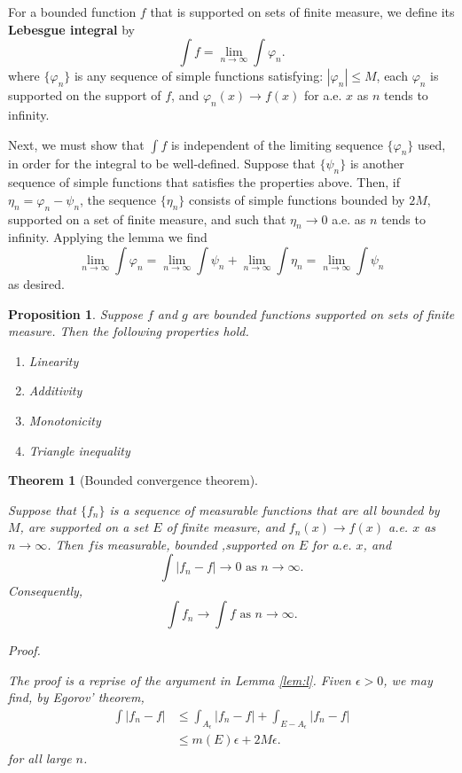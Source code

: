 \documentclass[
]{book}
\providecommand{\tightlist}{%
  \setlength{\itemsep}{0pt}\setlength{\parskip}{0pt}}
\newtheorem{theorem}{Theorem}[chapter]
\newtheorem{proposition}{Proposition}[chapter]
\theoremstyle{definition}
\theoremstyle{definition}
\theoremstyle{definition}
\theoremstyle{definition}
\theoremstyle{remark}
\begin{document}
For a bounded function \(f\) that is supported on sets of finite measure, we define its \textbf{Lebesgue integral} by
\[
\int f=\lim_{n\to\infty}\int\varphi_n.
\]
where \(\{\varphi_n\}\) is any sequence of simple functions satisfying: \(|\varphi_n|\le M\), each \(\varphi_n\) is supported on the support of \(f\), and \(\varphi_n(x)\to f(x)\) for a.e. \(x\) as \(n\) tends to infinity.

Next, we must show that \(\int f\) is independent of the limiting sequence \(\{\varphi_n\}\) used, in order for the integral to be well-defined. Suppose that \(\{\psi_n\}\) is another sequence of simple functions that satisfies the properties above. Then, if \(\eta_n = \varphi_n- \psi_n\), the sequence \(\{\eta_n\}\) consists of simple functions bounded by \(2M\), supported on a set of finite measure, and such that \(\eta_n\to 0\) a.e. as \(n\) tends to infinity. Applying the lemma we find
\[
\lim_{n\to\infty}\int \varphi_n =\lim_{n\to\infty}\int \psi_n+\lim_{n\to\infty}\int \eta_n=\lim_{n\to\infty}\int \psi_n
\]
as desired.

\begin{proposition}

Suppose \(f\) and \(g\) are bounded functions supported on sets of finite measure. Then the following properties hold.

\begin{enumerate}
\def\labelenumi{\arabic{enumi}.}
\tightlist
\item
  Linearity
\item
  Additivity
\item
  Monotonicity
\item
  Triangle inequality
\end{enumerate}

\end{proposition}

\begin{theorem}[Bounded convergence theorem]
\protect\hypertarget{thm:b}{}\label{thm:b}\leavevmode

Suppose that \(\{f_n\}\) is a sequence of measurable functions that are all bounded by \(M\), are supported on a set \(E\) of finite measure, and \(f_n(x)\to f(x)\) a.e. \(x\) as \(n\to\infty\). Then \(f\)is measurable, bounded ,supported on \(E\) for a.e. \(x\), and
\[
\int|f_n-f|\to 0 \text{ as } n\to\infty.
\]
Consequently,
\[
\int f_n\to \int f  \text{ as } n\to\infty.
\]

\emph{Proof.}

The proof is a reprise of the argument in Lemma \ref{lem:l}. Fiven \(\epsilon>0\), we may find, by Egorov' theorem,
\[
\begin{aligned}
\int|f_n-f| &\le \int_{A_\epsilon}|f_n-f|+\int_{E-A_\epsilon}|f_n-f|\\
&\le m(E)\epsilon+2M\epsilon.
\end{aligned}
\]
for all large \(n\).

\end{theorem}
\end{document}
